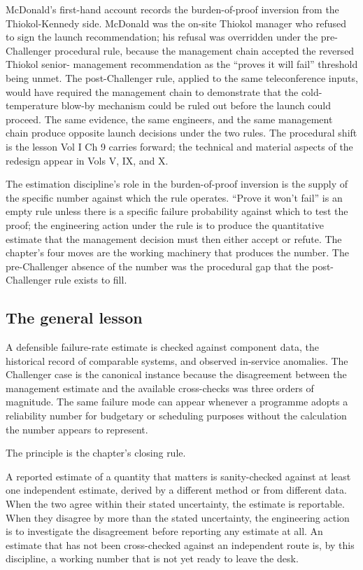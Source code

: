 McDonald's first-hand account \cite{hist:ch09t3-mcdonald-2009}
records the burden-of-proof inversion from the Thiokol-Kennedy
side. McDonald was the on-site Thiokol manager who refused to
sign the launch recommendation; his refusal was overridden
under the pre-Challenger procedural rule, because the
management chain accepted the reversed Thiokol senior-
management recommendation as the ``proves it will fail''
threshold being unmet. The post-Challenger rule, applied to the
same teleconference inputs, would have required the management
chain to demonstrate that the cold-temperature blow-by
mechanism could be ruled out before the launch could proceed.
The same evidence, the same engineers, and the same management
chain produce opposite launch decisions under the two rules.
The procedural shift is the lesson Vol I Ch 9 carries forward;
the technical and material aspects of the redesign appear in
Vols V, IX, and X.

The estimation discipline's role in the burden-of-proof
inversion is the supply of the specific number against which
the rule operates. ``Prove it won't fail'' is an empty rule
unless there is a specific failure probability against which to
test the proof; the engineering action under the rule is to
produce the quantitative estimate that the management decision
must then either accept or refute. The chapter's four moves
are the working machinery that produces the number. The
pre-Challenger absence of the number was the procedural gap
that the post-Challenger rule exists to fill.

\subsection{The general lesson}

A defensible failure-rate estimate is checked against component
data, the historical record of comparable systems, and observed
in-service anomalies. The Challenger case is the canonical instance
because the disagreement between the management estimate and the
available cross-checks was three orders of magnitude. The same
failure mode can appear whenever a programme adopts a reliability
number for budgetary or scheduling purposes without the calculation
the number appears to represent.

The principle is the chapter's closing rule.

\begin{principle}
A reported estimate of a quantity that matters is sanity-checked
against at least one independent estimate, derived by a different
method or from different data. When the two agree within their
stated uncertainty, the estimate is reportable. When they
disagree by more than the stated uncertainty, the engineering
action is to investigate the disagreement before reporting any
estimate at all. An estimate that has not been cross-checked
against an independent route is, by this discipline, a working
number that is not yet ready to leave the desk.
\end{principle}

